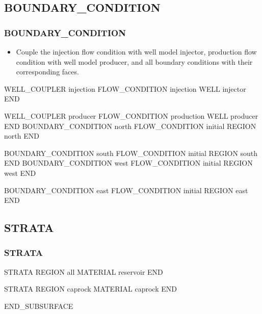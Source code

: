 \documentclass{beamer}
\newcommand\greencomment[1]{{{\color{green} #1}}}
\begin{document}
\subsection{BOUNDARY\_CONDITION}

\begin{frame}\frametitle{BOUNDARY\_CONDITION}

\begin{itemize}
\item Couple the \greencomment{injection} flow condition with well model \greencomment{injector}, \greencomment{production} flow condition with well model \greencomment{producer}, and all boundary conditions with their corresponding faces.
\end{itemize}

\begin{semiverbatim}
WELL_COUPLER injection
  FLOW_CONDITION injection
  WELL injector
END

WELL_COUPLER producer
  FLOW_CONDITION production
  WELL producer
END
\newpage
BOUNDARY_CONDITION north
  FLOW_CONDITION initial
  REGION north
END

BOUNDARY_CONDITION south
  FLOW_CONDITION initial
  REGION south
END
\newpage
BOUNDARY_CONDITION west
  FLOW_CONDITION initial
  REGION west
END

BOUNDARY_CONDITION east
  FLOW_CONDITION initial
  REGION east
END
\end{semiverbatim}

\end{frame}


\subsection{STRATA}

\begin{frame}[fragile]\frametitle{STRATA}

\begin{semiverbatim}

STRATA
  REGION all
  MATERIAL reservoir
END

STRATA
  REGION caprock
  MATERIAL caprock
END

END_SUBSURFACE
\end{semiverbatim}

\end{frame}

\end{document}
